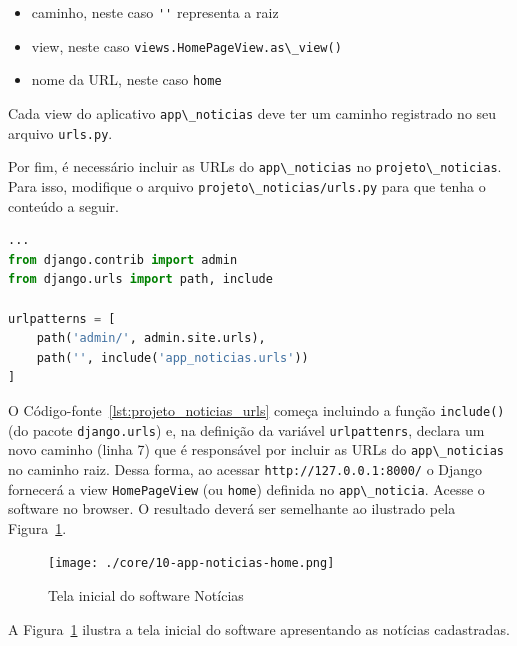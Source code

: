 \documentclass[brazil,a4paper,oneside,openright,parskip=full]{book}
\newcommand{\passthrough}[1]{#1}
\providecommand{\tightlist}{%
  \setlength{\itemsep}{0pt}\setlength{\parskip}{0pt}}
\begin{document}
\begin{itemize}
\tightlist
\item
  caminho, neste caso \passthrough{\lstinline!''!} representa a raiz
\item
  view, neste caso
  \passthrough{\lstinline!views.HomePageView.as\_view()!}
\item
  nome da URL, neste caso \passthrough{\lstinline!home!}
\end{itemize}

Cada view do aplicativo \passthrough{\lstinline!app\_noticias!} deve ter
um caminho registrado no seu arquivo \passthrough{\lstinline!urls.py!}.

Por fim, é necessário incluir as URLs do
\passthrough{\lstinline!app\_noticias!} no
\passthrough{\lstinline!projeto\_noticias!}. Para isso, modifique o
arquivo \passthrough{\lstinline!projeto\_noticias/urls.py!} para que
tenha o conteúdo a seguir.

\begin{lstlisting}[language=Python, caption={URLs do projeto Notícias}, label=lst:projeto_noticias_urls]
...
from django.contrib import admin
from django.urls import path, include

urlpatterns = [
    path('admin/', admin.site.urls),
    path('', include('app_noticias.urls'))
]
\end{lstlisting}

O Código-fonte~\ref{lst:projeto_noticias_urls} começa incluindo a função
\passthrough{\lstinline!include()!} (do pacote
\passthrough{\lstinline!django.urls!}) e, na definição da variável
\passthrough{\lstinline!urlpattenrs!}, declara um novo caminho (linha 7)
que é responsável por incluir as URLs do
\passthrough{\lstinline!app\_noticias!} no caminho raiz. Dessa forma, ao
acessar \passthrough{\lstinline!http://127.0.0.1:8000/!} o Django
fornecerá a view \passthrough{\lstinline!HomePageView!} (ou
\passthrough{\lstinline!home!}) definida no
\passthrough{\lstinline!app\_noticia!}. Acesse o software no browser. O
resultado deverá ser semelhante ao ilustrado pela
Figura~\ref{fig:10-app-noticias-home}.

\begin{figure}
\hypertarget{fig:10-app-noticias-home}{%
\centering
\texttt{[image: ./core/10-app-noticias-home.png]}
\caption{Tela inicial do software
Notícias}\label{fig:10-app-noticias-home}
}
\end{figure}

A Figura~\ref{fig:10-app-noticias-home} ilustra a tela inicial do
software apresentando as notícias cadastradas.
\end{document}
